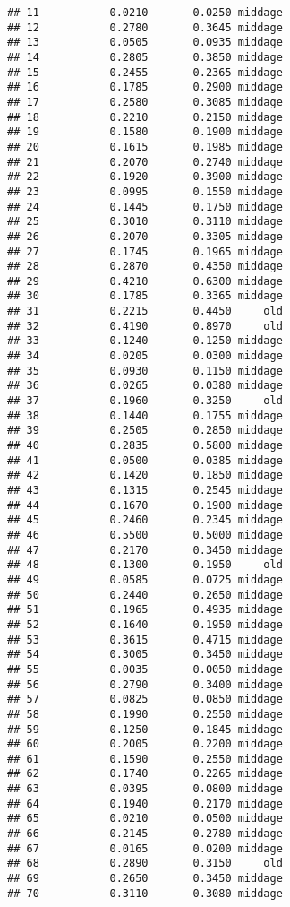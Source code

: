 \documentclass[
]{article}
\begin{document}
\begin{verbatim}
## 11           0.0210       0.0250 middage
## 12           0.2780       0.3645 middage
## 13           0.0505       0.0935 middage
## 14           0.2805       0.3850 middage
## 15           0.2455       0.2365 middage
## 16           0.1785       0.2900 middage
## 17           0.2580       0.3085 middage
## 18           0.2210       0.2150 middage
## 19           0.1580       0.1900 middage
## 20           0.1615       0.1985 middage
## 21           0.2070       0.2740 middage
## 22           0.1920       0.3900 middage
## 23           0.0995       0.1550 middage
## 24           0.1445       0.1750 middage
## 25           0.3010       0.3110 middage
## 26           0.2070       0.3305 middage
## 27           0.1745       0.1965 middage
## 28           0.2870       0.4350 middage
## 29           0.4210       0.6300 middage
## 30           0.1785       0.3365 middage
## 31           0.2215       0.4450     old
## 32           0.4190       0.8970     old
## 33           0.1240       0.1250 middage
## 34           0.0205       0.0300 middage
## 35           0.0930       0.1150 middage
## 36           0.0265       0.0380 middage
## 37           0.1960       0.3250     old
## 38           0.1440       0.1755 middage
## 39           0.2505       0.2850 middage
## 40           0.2835       0.5800 middage
## 41           0.0500       0.0385 middage
## 42           0.1420       0.1850 middage
## 43           0.1315       0.2545 middage
## 44           0.1670       0.1900 middage
## 45           0.2460       0.2345 middage
## 46           0.5500       0.5000 middage
## 47           0.2170       0.3450 middage
## 48           0.1300       0.1950     old
## 49           0.0585       0.0725 middage
## 50           0.2440       0.2650 middage
## 51           0.1965       0.4935 middage
## 52           0.1640       0.1950 middage
## 53           0.3615       0.4715 middage
## 54           0.3005       0.3450 middage
## 55           0.0035       0.0050 middage
## 56           0.2790       0.3400 middage
## 57           0.0825       0.0850 middage
## 58           0.1990       0.2550 middage
## 59           0.1250       0.1845 middage
## 60           0.2005       0.2200 middage
## 61           0.1590       0.2550 middage
## 62           0.1740       0.2265 middage
## 63           0.0395       0.0800 middage
## 64           0.1940       0.2170 middage
## 65           0.0210       0.0500 middage
## 66           0.2145       0.2780 middage
## 67           0.0165       0.0200 middage
## 68           0.2890       0.3150     old
## 69           0.2650       0.3450 middage
## 70           0.3110       0.3080 middage

\end{verbatim}
\end{document}

